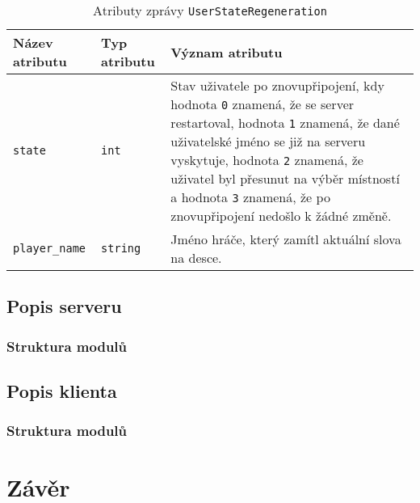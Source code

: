 \documentclass[12pt, a4paper]{article}
\let\oldsection\section
\renewcommand\section{\clearpage\oldsection}
\begin{document}
\begin{center}
		\begin{table}[!ht]
		     \caption{Atributy zprávy \texttt{UserStateRegeneration}}
		\begin{tabularx}{\textwidth}{|l|l|X|}
			\hline
			\textbf{Název atributu} & \textbf{Typ atributu} & \textbf{Význam atributu} \\ 
			\hline
			\texttt{state}          &\texttt{int}&Stav uživatele po znovupřipojení, kdy hodnota \texttt{0} znamená, že se server restartoval, hodnota \texttt{1} znamená, že dané uživatelské jméno se již na serveru vyskytuje, hodnota \texttt{2} znamená, že uživatel byl přesunut na výběr místností a hodnota \texttt{3} znamená, že po znovupřipojení nedošlo k žádné změně.\\
			\hline
			\texttt{player\_name}          &\texttt{string}&Jméno hráče, který zamítl aktuální slova na desce.\\
			\hline
		\end{tabularx}
		\end{table}
\end{center}  	


	    \subsection{Popis serveru}
		    \subsubsection{Struktura modulů}

	    \subsection{Popis klienta}
   		    \subsubsection{Struktura modulů}
    
    \section{Závěr}
    



	
	
\end{document}
